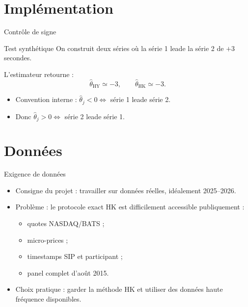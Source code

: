 \documentclass[10pt,aspectratio=169]{beamer}
\newcommand{\thetahat}{\hat{\theta}}
\begin{document}
\section{Implémentation}

\begin{frame}{Contrôle de signe}
  \begin{block}{Test synthétique}
    On construit deux séries où la série 1 leade la série 2 de \(+3\) secondes.
  \end{block}

  \vspace{0.25cm}
  L'estimateur retourne :
  \[
    \thetahat_{\text{HY}} \simeq -3,
    \qquad
    \thetahat_{\text{HK}} \simeq -3.
  \]

  \vspace{0.25cm}
  \begin{itemize}
    \item Convention interne : \(\thetahat_j < 0 \Leftrightarrow\) série 1 leade série 2.
    \item Donc \(\thetahat_j > 0 \Leftrightarrow\) série 2 leade série 1.
  \end{itemize}
\end{frame}

\section{Données}

\begin{frame}{Exigence de données}
  \begin{itemize}
    \item Consigne du projet : travailler sur données réelles, idéalement 2025--2026.
    \item Problème : le protocole exact HK est difficilement accessible publiquement :
      \begin{itemize}
        \item quotes NASDAQ/BATS ;
        \item micro-prices ;
        \item timestamps SIP et participant ;
        \item panel complet d'août 2015.
      \end{itemize}
    \item Choix pratique : garder la méthode HK et utiliser des données haute fréquence disponibles.
  \end{itemize}
\end{frame}
\end{document}

